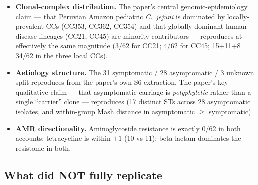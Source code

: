 \documentclass[11pt]{article}
\begin{document}
\begin{itemize}[leftmargin=1.5em]
  \item \textbf{Clonal-complex distribution.} The paper's central genomic-epidemiology
        claim --- that Peruvian Amazon pediatric \emph{C.\ jejuni} is
        dominated by locally-prevalent CCs (CC353, CC362, CC354) and that
        globally-dominant human-disease lineages (CC21, CC45) are minority
        contributors --- reproduces at effectively the same magnitude
        (3/62 for CC21; 4/62 for CC45; 15+11+8 = 34/62 in the three local CCs).
  \item \textbf{Aetiology structure.} The 31 symptomatic / 28 asymptomatic /
        3 unknown split reproduces from the paper's own S6 extraction. The
        paper's key qualitative claim --- that asymptomatic carriage is
        \emph{polyphyletic} rather than a single ``carrier'' clone ---
        reproduces (17 distinct STs across 28 asymptomatic isolates, and
        within-group Mash distance in asymptomatic $\geq$ symptomatic).
  \item \textbf{AMR directionality.} Aminoglycoside resistance is exactly
        0/62 in both accounts; tetracycline is within $\pm 1$
        (10 vs 11); beta-lactam dominates the resistome in both.
\end{itemize}

\subsection*{What did NOT fully replicate}
\end{document}
